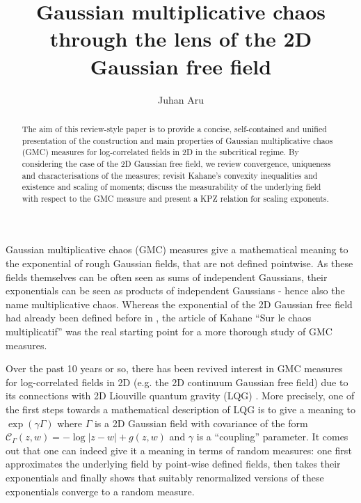 \documentclass[11pt]{amsart}
\newcommand{\C}{\mathcal C}
\renewcommand{\1}{\mathbf 1}
\begin{document}
	\title{Gaussian multiplicative chaos through the lens of the 2D Gaussian free field}
	\author{Juhan Aru}
	\begin{abstract}
	The aim of this review-style paper is to provide a concise, self-contained and unified presentation of the construction and main properties of Gaussian multiplicative chaos (GMC) measures for log-correlated fields in 2D in the subcritical regime. By considering the case of the 2D Gaussian free field, we review convergence, uniqueness and characterisations of the measures; revisit Kahane's convexity inequalities and existence and scaling of moments; discuss the measurability of the underlying field with respect to the GMC measure and present a KPZ relation for scaling exponents.
	\end{abstract}
	\maketitle

Gaussian multiplicative chaos (GMC) measures give a mathematical meaning to the exponential of rough Gaussian fields, that are not defined pointwise. As these fields themselves can be often seen as sums of independent Gaussians, their exponentials can be seen as products of independent Gaussians - hence also the name multiplicative chaos. Whereas the exponential of the 2D Gaussian free field had already been defined before in \cite{HK}, the article of Kahane ``Sur le chaos multiplicatif'' \cite{Kah} was the real starting point for a more thorough study of GMC measures. 

Over the past 10 years or so, there has been revived interest in GMC measures for log-correlated fields in 2D (e.g. the 2D continuum Gaussian free field) due to its connections with 2D Liouville quantum gravity (LQG) \cite{DS, DMS, DKRV}. More precisely, one of the first steps towards a mathematical description of LQG is to give a meaning to $\exp(\gamma \Gamma)$ where $\Gamma$ is a 2D Gaussian field with covariance of the form $\C_\Gamma(z,w) = -\log |z-w| + g(z,w)$ and $\gamma$ is a ``coupling'' parameter. It comes out that one can indeed give it a meaning in terms of random measures: one first approximates the underlying field by point-wise defined fields, then takes their exponentials and finally shows that suitably renormalized versions of these exponentials converge to a random measure.
\end{document}
